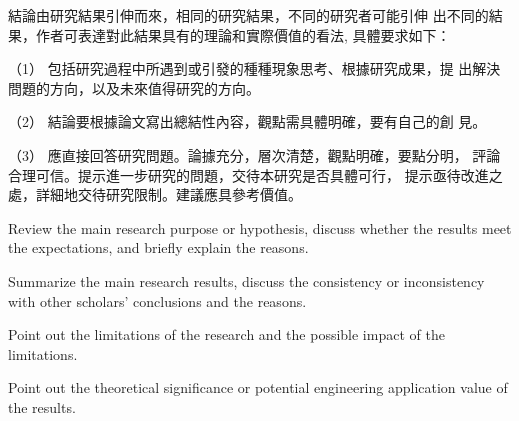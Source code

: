結論由研究結果引伸而來，相同的研究結果，不同的研究者可能引伸
出不同的結果，作者可表達對此結果具有的理論和實際價值的看法, 具體要求如下：

（1） 包括研究過程中所遇到或引發的種種現象思考、根據研究成果，提
出解決問題的方向，以及未來值得研究的方向。

（2） 結論要根據論文寫出總結性內容，觀點需具體明確，要有自己的創
見。

（3） 應直接回答研究問題。論據充分，層次清楚，觀點明確，要點分明，
評論合理可信。提示進一步研究的問題，交待本研究是否具體可行，
提示亟待改進之處，詳細地交待研究限制。建議應具參考價值。



Review the main research purpose or hypothesis, discuss whether the results meet the expectations, and briefly explain the reasons.

Summarize the main research results, discuss the consistency or inconsistency with other scholars' conclusions and the reasons.


Point out the limitations of the research and the possible impact of the limitations.

Point out the theoretical significance or potential engineering application value of the results.